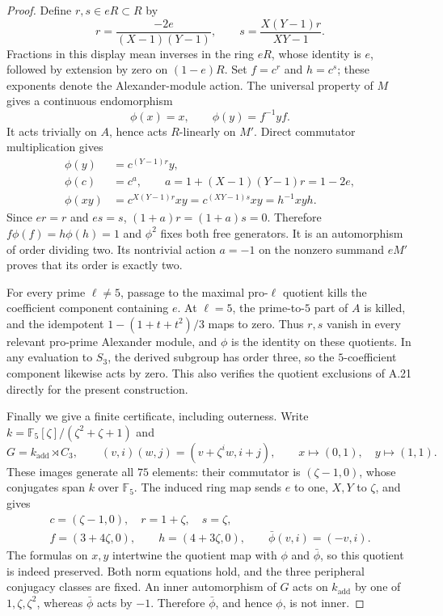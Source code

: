 \begin{proof}
Define $r,s\in eR\subset R$ by
\[
       r=\frac{-2e}{(X-1)(Y-1)},\qquad
       s=\frac{X(Y-1)r}{XY-1}.
\]
Fractions in this display mean inverses in the ring
$eR$, whose identity is $e$, followed by extension
by zero on $(1-e)R$. Set $f=c^r$ and $h=c^s$;
these exponents denote the Alexander-module action.
The universal property of $M$ gives a continuous
endomorphism
\[
                  \phi(x)=x,\qquad
                  \phi(y)=f^{-1}yf.
\]
It acts trivially on $A$, hence acts $R$-linearly on
$M'$. Direct commutator multiplication gives
\[
 \begin{aligned}
  \phi(y)&=c^{(Y-1)r}y,\\
  \phi(c)&=c^a,\qquad
       a=1+(X-1)(Y-1)r=1-2e,\\
  \phi(xy)&=c^{X(Y-1)r}xy
             =c^{(XY-1)s}xy=h^{-1}xyh.
 \end{aligned}
\]
Since $er=r$ and $es=s$,
$(1+a)r=(1+a)s=0$. Therefore
$f\phi(f)=h\phi(h)=1$ and $\phi^2$ fixes both free
generators. It is an automorphism of order dividing
two. Its nontrivial action $a=-1$ on the nonzero
summand $eM'$ proves that its order is exactly two.

For every prime $\ell\ne5$, passage to the maximal
pro-$\ell$ quotient kills the coefficient component
containing $e$. At $\ell=5$, the prime-to-$5$ part of
$A$ is killed, and the idempotent
$1-(1+t+t^2)/3$ maps to zero. Thus $r,s$ vanish in
every relevant pro-prime Alexander module, and $\phi$
is the identity on these quotients. In any evaluation
to $S_3$, the derived subgroup has order three, so the
$5$-coefficient component likewise acts by zero.
This also verifies the quotient exclusions of A.21
directly for the present construction.

Finally we give a finite certificate, including
outerness. Write
$k=\mathbb F_5[\zeta]/(\zeta^2+\zeta+1)$ and
\[
 G=k_{\mathrm{add}}\rtimes C_3,\qquad
 (v,i)(w,j)=(v+\zeta^i w,i+j),\qquad
 x\mapsto(0,1),\quad y\mapsto(1,1).
\]
These images generate all $75$ elements: their
commutator is $(\zeta-1,0)$, whose conjugates span
$k$ over $\mathbb F_5$. The induced ring map sends
$e$ to one, $X,Y$ to $\zeta$, and gives
\[
 \begin{gathered}
 c=(\zeta-1,0),\quad r=1+\zeta,\quad s=\zeta,\\
 f=(3+4\zeta,0),\qquad h=(4+3\zeta,0),\qquad
 \bar\phi(v,i)=(-v,i).
 \end{gathered}
\]
The formulas on $x,y$ intertwine the quotient map
with $\phi$ and $\bar\phi$, so this quotient is indeed
preserved. Both norm equations hold, and the three
peripheral conjugacy classes are fixed.
An inner automorphism of $G$ acts on $k_{\mathrm{add}}$
by one of $1,\zeta,\zeta^2$, whereas $\bar\phi$ acts
by $-1$. Therefore $\bar\phi$, and hence $\phi$, is
not inner.


\end{proof}
